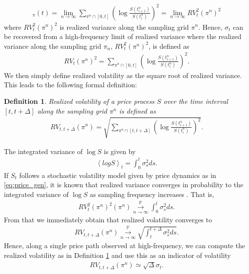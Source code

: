 \documentclass{article}
\newtheorem{definition}{Definition}
\begin{document}
\begin{align*}
[\log S]_\pi (t) = \lim_{n\rightarrow \infty} \sum_{\pi^n \cap [0,t]} \left( \log \frac{S(t^n_{i+1})}{S(t^n_i)}\right)^2 = \lim_{n\rightarrow \infty} RV_t^2(\pi^n)^2
\end{align*}
where $RV_t^2(\pi^n)^2$ is realized variance along the sampling grid $\pi^n$. Hence, $\sigma_t$ can be recovered from a high-frequency limit of realized variance where the realized variance along the sampling grid $\pi_n$, $RV_t^2(\pi^n)^2$, is defined as
\begin{align}
RV_t(\pi^n)^2 = \sum_{\pi^n \cap [0,t]}\left(\log \frac{S(t^n_{i+1})}{S(t^n_i)}\right)^2. \label{eq:real_var_orig}
\end{align} 
We then simply define realized volatility as the square root of realized variance. This leads to the following formal definition: 
\begin{definition}
Realized volatility of a price process $S$ over the time interval $[t,t+\Delta]$ along the sampling grid $\pi^n$ is defined as 
\begin{align*}
RV_{t,t+\Delta}(\pi^n) = \sqrt{\sum_{\pi^n \cap [t,t+\Delta]}\left(\log \frac{S(t^n_{i+1})}{S(t^n_i)}\right)^2}. 
\end{align*}
\label{def:real_vol}
\end{definition}
The integrated variance of $\log S$ is given by
\begin{align}
\left\langle log S \right\rangle_t = \int_0^t \sigma_s^2 ds. \label{eq:int_var}
\end{align}
If $S_t$ follows a stochastic volatility model given by price dynamics as in \eqref{eq:price_gen}, it is known that realized variance converges in probability to the integrated variance of $\log S$ as sampling frequency increases \cite{jacod2012}. That is,
\begin{align*}
RV_t^2(\pi^n)^2 (\pi^n) \overset{\mathbb{P}}{\underset{n \to \infty}{\longrightarrow}} \int_0^t \sigma_s^2 ds.
\end{align*} 
From that we immediately obtain that realized volatility converges to
\begin{align*}
 RV_{t,t+\Delta} (\pi^n) \overset{\mathbb{P}}{\underset{n \to \infty}{\longrightarrow}} \sqrt{\int^{t+\Delta}_t\sigma^2_s ds}.
\end{align*}
Hence, along a single price path observed at high-frequency, we can compute the realized volatility as in Definition \ref{def:real_vol} and use this as an indicator of volatility
\begin{align*}
 RV_{t,t+\Delta} (\pi^n)\simeq \sqrt{\Delta} \sigma_t.
\end{align*}
\end{document}
